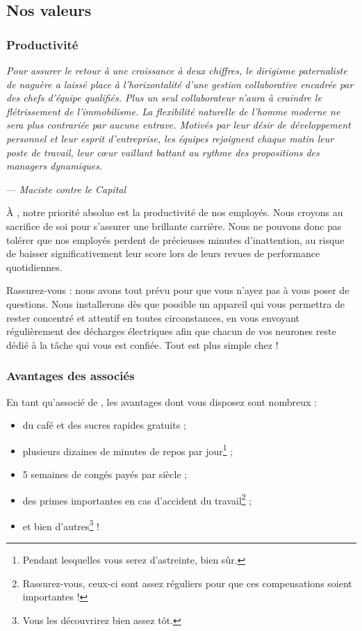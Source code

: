 \subsection{Nos valeurs}

\subsubsection{Productivité}

\emph{Pour assurer le retour à une croissance à deux chiffres, le dirigisme
paternaliste de naguère a laissé place à l'horizontalité d'une gestion
collaborative encadrée par des chefs d'équipe qualifiés. Plus un seul
collaborateur n'aura à craindre le flétrissement de l'immobilisme. La
flexibilité naturelle de l'homme moderne ne sera plus contrariée par aucune
entrave. Motivés par leur désir de développement personnel et leur esprit
d'entreprise, les équipes rejoignent chaque matin leur poste de travail, leur
cœur vaillant battant au rythme des propositions des managers dynamiques.}

\vspace{0.3cm}
\hspace{3cm} --- \emph{Maciste contre le Capital}

À \provogon{}, notre priorité absolue est la productivité de nos employés. Nous
croyons au sacrifice de soi pour s'assurer une brillante carrière. Nous ne
pouvons donc pas tolérer que nos employés perdent de précieuses minutes
d'inattention, au risque de baisser significativement leur score lors de leurs revues de
performance quotidiennes.

Rassurez-vous : nous avons tout prévu pour que vous n'ayez pas à vous poser de
questions. Nous installerons dès que possible un appareil qui vous permettra
de rester concentré et attentif en toutes circonstances, en vous envoyant
régulièrement des décharges électriques afin que chacun de vos neurones reste
dédié à la tâche qui vous est confiée. Tout est plus simple chez \provogon{} !

\subsubsection{Avantages des associés}

En tant qu'associé de \provogon{}, les avantages dont vous disposez sont nombreux :

\begin{itemize}
    \item du café et des sucres rapides gratuits ;
    \item plusieurs dizaines de minutes de repos par jour\footnote{Pendant
        lesquelles vous serez d'astreinte, bien sûr.} ;
    \item 5 semaines de congés payés par siècle ;
    \item des primes importantes en cas d'accident du
        travail\footnote{Rassurez-vous, ceux-ci sont assez réguliers pour
        que ces compensations soient importantes !} ;
    \item et bien d'autres\footnote{Vous les découvrirez bien assez tôt.} !
\end{itemize}

